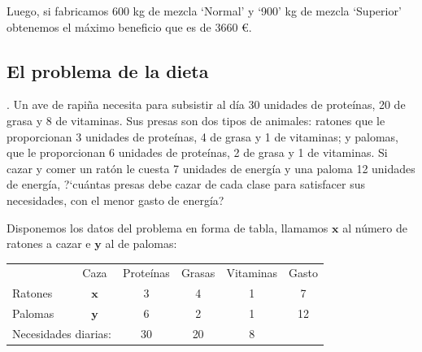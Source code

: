 \vspace{5mm}
\begin{destacado}
Luego, si fabricamos 600 kg de mezcla `Normal' y `900' kg de mezcla `Superior' obtenemos el máximo beneficio que es de 3660 \euro.	
\end{destacado}

\vspace{10mm}	
	\subsection{El problema de la dieta}
	\vspace{10mm}

\begin{example}
.	Un ave de rapiña necesita para subsistir al día 30 unidades de proteínas, 20 de grasa y 8 de vitaminas. Sus presas son dos tipos de animales: ratones que le proporcionan 3 unidades de proteínas, 4 de grasa y 1 de vitaminas; y palomas, que le proporcionan 6 unidades de proteínas, 2 de grasa y 1 de vitaminas. Si cazar y comer un ratón le cuesta 7 unidades de energía y una paloma 12 unidades de energía, ?`cuántas presas debe cazar de cada clase para satisfacer sus necesidades, con el menor gasto de energía?	
\end{example}

\vspace{5mm}
Disponemos los datos del problema en forma de tabla, llamamos $\boldsymbol{x}$ al número de ratones a cazar e $\boldsymbol{y}$ al de palomas:

\begin{table}[H]
\centering
\begin{tabular}{lc|c|c|cc}
\multicolumn{1}{c}{} & Caza & Proteínas & Grasas & \multicolumn{1}{c|}{Vitaminas} & Gasto \\ \cline{2-6} 
\multicolumn{1}{l|}{Ratones} & $\boldsymbol{x}$ & 3 & 4 & \multicolumn{1}{c|}{1} & \multicolumn{1}{c|}{7} \\ \hline
\multicolumn{1}{l|}{Palomas} & $\boldsymbol{y}$ & 6 & 2 & \multicolumn{1}{c|}{1} & \multicolumn{1}{c|}{12} \\ \hline
\multicolumn{2}{c}{Necesidades diarias:} & 30 & 20 & 8 & 
\end{tabular}
\end{table}

